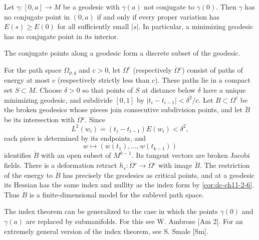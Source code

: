 \begin{corollary}
  \label{cor:dc-ch11-2-9}
  Let $\gamma:[0,a]\to M$ be a geodesic with $\gamma(a)$ not conjugate to
  $\gamma(0)$. Then $\gamma$ has no conjugate point in $(0,a)$ if and only if every
  proper variation has $E(s)\geq E(0)$ for all sufficiently small $|s|$. In
  particular, a minimizing geodesic has no conjugate point in its interior.
\end{corollary}

\begin{corollary}
  \label{cor:dc-ch11-2-10}
  The conjugate points along a geodesic form a discrete subset of the geodesic.
\end{corollary}

\begin{remark}
  \label{rem:dc-ch11-2-12}
  For the path space $\Omega_{p,q}$ and $c>0$, let $\Omega^c$ (respectively
  $\mathring{\Omega}{}^c$) consist of paths of energy at most $c$ (respectively
  strictly less than $c$). These paths lie in a compact set $S\subset M$. Choose
  $\delta>0$ so that points of $S$ at distance below $\delta$ have a unique
  minimizing geodesic, and subdivide $[0,1]$ by
  $|t_i-t_{i-1}|<\delta^2/c$. Let $B\subset\Omega^c$ be the broken geodesics
  whose pieces join consecutive subdivision points, and let $\mathring B$ be its
  intersection with $\mathring{\Omega}{}^c$. Since
  \[
    L^2(w_i)=(t_i-t_{i-1})E(w_i)<\delta^2,
  \]
  each piece is determined by its endpoints, and
  \[
    w\longmapsto(w(t_1),\ldots,w(t_{k-1}))
  \]
  identifies $\mathring B$ with an open subset of $M^{k-1}$. Its tangent vectors
  are broken Jacobi fields. There is a deformation retract
  $h_s:\mathring{\Omega}{}^c\to\mathring{\Omega}{}^c$ with image $\mathring B$.
  The restriction of the energy to $\mathring B$ has precisely the geodesics as
  critical points, and at a geodesic its Hessian has the same index and nullity as
  the index form by \cref{cor:dc-ch11-2-6}. Thus $\mathring B$ is a finite-dimensional
  model for the sublevel path space.
\end{remark}

\begin{remark}[Remark 2.11]
  \label{rem:dc-ch11-2-11}
  The index theorem can be generalized to the case in which the points $\gamma(0)$
  and $\gamma(a)$ are replaced by submanifolds. For this see W. Ambrose [Am 2]. For
  an extremely general version of the index theorem, see S. Smale [Sm].
\end{remark}

